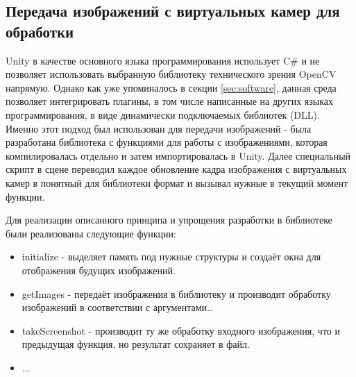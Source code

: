 \subsection{Передача изображений с виртуальных камер для обработки}
Unity в качестве основного языка программирования использует C# и не позволяет использовать 
выбранную библиотеку технического зрения OpenCV напрямую. Однако как уже упоминалось в секции 
\ref{sec:software}, данная среда позволяет интегрировать плагины, в том числе написанные на 
других языках программирования, в виде динамически подключаемых библиотек (DLL). Именно этот 
подход был использован для передачи изображений - была разработана библиотека с функциями для 
работы с изображениями, которая компилировалась отдельно и затем импортировалась в Unity. Далее 
специальный скрипт в сцене переводил каждое обновление кадра изображения с виртуальных камер в 
понятный для библиотеки формат и вызывал      %
нужные в текущий момент функции.    

Для реализации описанного принципа и упрощения разработки в библиотеке были реализованы следующие функции:
\begin{itemize}
    \item initialize - выделяет память под нужные структуры и создаёт окна для отображения будущих изображений.
    \item getImages - передаёт изображения в библиотеку и производит обработку изображений в 
    соответствии с аргументами\dots
    \item takeScreenshot - производит ту же обработку входного изображения, что и предыдущая функция,
     но результат сохраняет в файл. 
    \item ...    
\end{itemize}